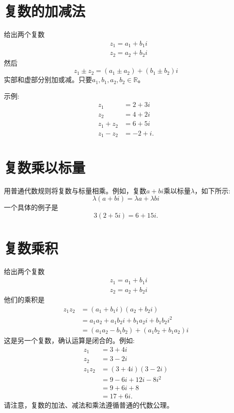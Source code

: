 \section{复数的加减法}
给出两个复数
$$
\begin{aligned}
& z_{1}=a_{1}+b_{1} i \\
& z_{2}=a_{2}+b_{2} i
\end{aligned}
$$
然后
$$
z_{1} \pm z_{2}=\left(a_{1} \pm a_{2}\right)+\left(b_{1} \pm b_{2}\right) i
$$
实部和虚部分别加或减。只要$a_{1}, b_{1}, a_{2}, b_{2} \in \mathbb{R}$。

示例:
$$
\begin{aligned}
z_{1} & =2+3 i \\
z_{2} & =4+2 i \\
z_{1}+z_{2} & =6+5 i \\
z_{1}-z_{2} & =-2+i .
\end{aligned}
$$

\section{复数乘以标量}
用普通代数规则将复数与标量相乘。例如，复数$a+ bi $乘以标量$\lambda$，如下所示:
$$
\lambda(a+b i)=\lambda a+\lambda b i
$$
一个具体的例子是
$$
3(2+5 i)=6+15 i .
$$

\section{复数乘积}
给出两个复数
$$
\begin{aligned}
& z_{1}=a_{1}+b_{1} i \\
& z_{2}=a_{2}+b_{2} i
\end{aligned}
$$
他们的乘积是
$$
\begin{aligned}
z_{1} z_{2} & =\left(a_{1}+b_{1} i\right)\left(a_{2}+b_{2} i\right) \\
& =a_{1} a_{2}+a_{1} b_{2} i+b_{1} a_{2} i+b_{1} b_{2} i^{2} \\
& =\left(a_{1} a_{2}-b_{1} b_{2}\right)+\left(a_{1} b_{2}+b_{1} a_{2}\right) i
\end{aligned}
$$
这是另一个复数，确认运算是闭合的。例如:
$$
\begin{aligned}
z_{1} & =3+4 i \\
z_{2} & =3-2 i \\
z_{1} z_{2} & =(3+4 i)(3-2 i) \\
& =9-6 i+12 i-8 i^{2} \\
& =9+6 i+8 \\
& =17+6 i .
\end{aligned}
$$
请注意，复数的加法、减法和乘法遵循普通的代数公理。

